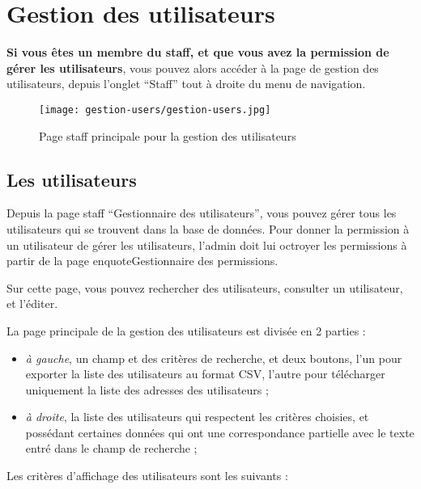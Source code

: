 \section{Gestion des utilisateurs}

\textbf{Si vous êtes un membre du staff, et que vous avez la permission de gérer les utilisateurs}, vous pouvez alors accéder à la page de gestion des utilisateurs, depuis l'onglet \enquote{Staff} tout à droite du menu de navigation.

\begin{figure}[H]
\centering
\texttt{[image: gestion-users/gestion-users.jpg]}
\caption{Page staff principale pour la gestion des utilisateurs}
\end{figure}

\subsection{Les utilisateurs}

Depuis la page staff \enquote{Gestionnaire des utilisateurs}, vous pouvez gérer tous les utilisateurs qui se trouvent dans la base de données. Pour donner la permission à un utilisateur de gérer les utilisateurs, l'admin doit lui octroyer les permissions à partir de la page enquote{Gestionnaire des permissions}.

\bigskip

Sur cette page, vous pouvez rechercher des utilisateurs, consulter un utilisateur, et l'éditer.\newline

La page principale de la gestion des utilisateurs est divisée en 2 parties :

\begin{itemize}
\item \textit{à gauche}, un champ et des critères de recherche, et deux boutons, l'un pour exporter la liste des utilisateurs au format CSV, l'autre pour télécharger uniquement la liste des adresses des utilisateurs ;
\item \textit{à droite}, la liste des utilisateurs qui respectent les critères choisies, et possédant certaines données qui ont une correspondance partielle avec le texte entré dans le champ de recherche ;
\end{itemize}
\bigskip

Les critères d'affichage des utilisateurs sont les suivants :

